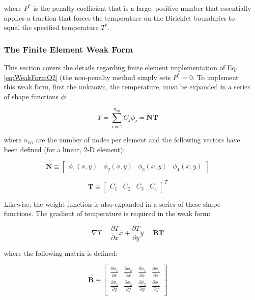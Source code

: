 \documentclass[10pt]{article}
\begin{document}
where \(P^{*}\) is the penalty coefficient that is a large, positive number that essentially applies a traction that forces the temperature on the Dirichlet boundaries to equal the specified temperature \(T^{*}\). 

\subsubsection{The Finite Element Weak Form}

This section covers the details regarding finite element implementation of Eq. \eqref{eq:WeakFormQ2} (the non-penalty method simply sets \(P^{*}=0\). To implement this weak form, first the unknown, the temperature, must be expanded in a series of shape functions \(\phi\):

\begin{equation}
T=\sum_{i=1}^{n_{en}}C_j\phi_j=\textbf{N}\textbf{T}
\end{equation}

where \(n_{en}\) are the number of nodes per element and the following vectors have been defined (for a linear, 2-D element):

\begin{equation}
\textbf{N}\equiv\begin{bmatrix}\phi_1(x,y) & \phi_2(x,y) & \phi_3(x,y) & \phi_4(x,y)
\end{bmatrix}
\end{equation}

\begin{equation}
\textbf{T}\equiv\begin{bmatrix}C_1 &  C_2 & C_3 & C_4
\end{bmatrix}^T
\end{equation}

Likewise, the weight function is also expanded in a series of these shape functions. The gradient of temperature is required in the weak form:

\begin{equation}
\nabla T=\frac{\partial T}{\partial x}\hat{x}+\frac{\partial T}{\partial y}\hat{y}=\textbf{B}\textbf{T}
\end{equation}

where the following matrix is defined:

\begin{equation}
\textbf{B}\equiv\begin{bmatrix}\frac{\partial \phi_1}{\partial x} & \frac{\partial \phi_2}{\partial x} & \frac{\partial \phi_3}{\partial x} & \frac{\partial \phi_4}{\partial x}\\
\frac{\partial \phi_1}{\partial y} & \frac{\partial \phi_2}{\partial y} & \frac{\partial \phi_3}{\partial y} & \frac{\partial \phi_4}{\partial y}\\
\end{bmatrix}
\end{equation}
\end{document}
